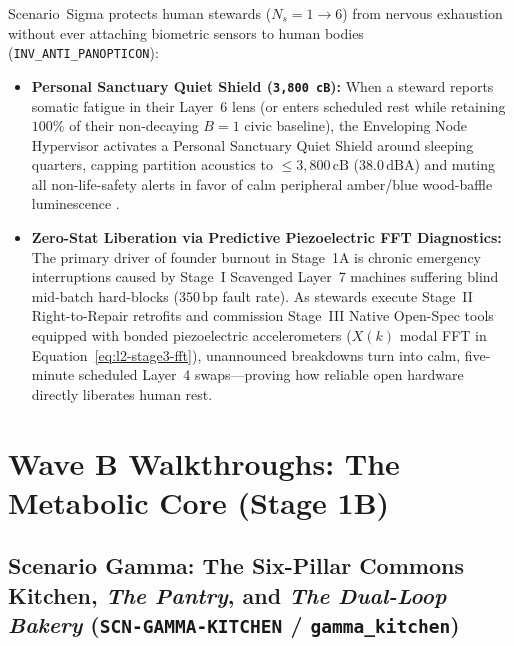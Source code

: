 Scenario~Sigma protects human stewards ($N_s = 1 \to 6$) from nervous exhaustion without ever attaching biometric sensors to human bodies (\texttt{INV\_ANTI\_PANOPTICON}):
\begin{itemize}
    \item \textbf{Personal Sanctuary Quiet Shield (\texttt{3,800 cB}):} When a steward reports somatic fatigue in their Layer~6 lens (or enters scheduled rest while retaining $100\%$ of their non-decaying $B=1$ civic baseline), the Enveloping Node Hypervisor activates a Personal Sanctuary Quiet Shield around sleeping quarters, capping partition acoustics to $\le 3{,}800\,\mathrm{cB}$ ($38.0\,\mathrm{dBA}$) and muting all non-life-safety alerts in favor of calm peripheral amber/blue wood-baffle luminescence \parencite{weiser1996calm}.
    \item \textbf{Zero-Stat Liberation via Predictive Piezoelectric FFT Diagnostics:} The primary driver of founder burnout in Stage~1A is chronic emergency interruptions caused by Stage~I Scavenged Layer~7 machines suffering blind mid-batch hard-blocks ($350\,\mathrm{bp}$ fault rate). As stewards execute Stage~II Right-to-Repair retrofits and commission Stage~III Native Open-Spec tools equipped with bonded piezoelectric accelerometers ($X(k)$ modal FFT in Equation~\eqref{eq:l2-stage3-fft}), unannounced breakdowns turn into calm, five-minute scheduled Layer~4 swaps---proving how reliable open hardware directly liberates human rest.
\end{itemize}

\section{Wave B Walkthroughs: The Metabolic Core (Stage 1B)}
\label{sec:l2-wave-b-walkthroughs}

\subsection{Scenario Gamma: The Six-Pillar Commons Kitchen, \textit{The Pantry}, and \textit{The Dual-Loop Bakery} (\texttt{SCN-GAMMA-KITCHEN} / \texttt{gamma\_kitchen})}

